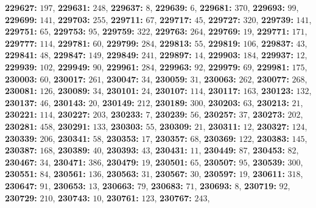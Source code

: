 \textsf{\bfseries 229627:} $197$, \textsf{\bfseries 229631:} $248$, \textsf{\bfseries 229637:} $8$, \textsf{\bfseries 229639:} $6$, \textsf{\bfseries 229681:} $370$, \textsf{\bfseries 229693:} $99$, \textsf{\bfseries 229699:} $141$, \textsf{\bfseries 229703:} $255$, \textsf{\bfseries 229711:} $67$, \textsf{\bfseries 229717:} $45$, \textsf{\bfseries 229727:} $320$, \textsf{\bfseries 229739:} $141$, \textsf{\bfseries 229751:} $65$, \textsf{\bfseries 229753:} $95$, \textsf{\bfseries 229759:} $322$, \textsf{\bfseries 229763:} $264$, \textsf{\bfseries 229769:} $19$, \textsf{\bfseries 229771:} $171$, \textsf{\bfseries 229777:} $114$, \textsf{\bfseries 229781:} $60$, \textsf{\bfseries 229799:} $284$, \textsf{\bfseries 229813:} $55$, \textsf{\bfseries 229819:} $106$, \textsf{\bfseries 229837:} $43$, \textsf{\bfseries 229841:} $48$, \textsf{\bfseries 229847:} $149$, \textsf{\bfseries 229849:} $241$, \textsf{\bfseries 229897:} $14$, \textsf{\bfseries 229903:} $184$, \textsf{\bfseries 229937:} $12$, \textsf{\bfseries 229939:} $102$, \textsf{\bfseries 229949:} $90$, \textsf{\bfseries 229961:} $284$, \textsf{\bfseries 229963:} $92$, \textsf{\bfseries 229979:} $69$, \textsf{\bfseries 229981:} $175$, \textsf{\bfseries 230003:} $60$, \textsf{\bfseries 230017:} $261$, \textsf{\bfseries 230047:} $34$, \textsf{\bfseries 230059:} $31$, \textsf{\bfseries 230063:} $262$, \textsf{\bfseries 230077:} $268$, \textsf{\bfseries 230081:} $126$, \textsf{\bfseries 230089:} $34$, \textsf{\bfseries 230101:} $24$, \textsf{\bfseries 230107:} $114$, \textsf{\bfseries 230117:} $163$, \textsf{\bfseries 230123:} $132$, \textsf{\bfseries 230137:} $46$, \textsf{\bfseries 230143:} $20$, \textsf{\bfseries 230149:} $212$, \textsf{\bfseries 230189:} $300$, \textsf{\bfseries 230203:} $63$, \textsf{\bfseries 230213:} $21$, \textsf{\bfseries 230221:} $114$, \textsf{\bfseries 230227:} $203$, \textsf{\bfseries 230233:} $7$, \textsf{\bfseries 230239:} $56$, \textsf{\bfseries 230257:} $37$, \textsf{\bfseries 230273:} $202$, \textsf{\bfseries 230281:} $458$, \textsf{\bfseries 230291:} $133$, \textsf{\bfseries 230303:} $55$, \textsf{\bfseries 230309:} $21$, \textsf{\bfseries 230311:} $12$, \textsf{\bfseries 230327:} $124$, \textsf{\bfseries 230339:} $206$, \textsf{\bfseries 230341:} $58$, \textsf{\bfseries 230353:} $17$, \textsf{\bfseries 230357:} $68$, \textsf{\bfseries 230369:} $122$, \textsf{\bfseries 230383:} $145$, \textsf{\bfseries 230387:} $168$, \textsf{\bfseries 230389:} $40$, \textsf{\bfseries 230393:} $43$, \textsf{\bfseries 230431:} $11$, \textsf{\bfseries 230449:} $87$, \textsf{\bfseries 230453:} $82$, \textsf{\bfseries 230467:} $34$, \textsf{\bfseries 230471:} $386$, \textsf{\bfseries 230479:} $19$, \textsf{\bfseries 230501:} $65$, \textsf{\bfseries 230507:} $95$, \textsf{\bfseries 230539:} $300$, \textsf{\bfseries 230551:} $84$, \textsf{\bfseries 230561:} $136$, \textsf{\bfseries 230563:} $31$, \textsf{\bfseries 230567:} $30$, \textsf{\bfseries 230597:} $19$, \textsf{\bfseries 230611:} $318$, \textsf{\bfseries 230647:} $91$, \textsf{\bfseries 230653:} $13$, \textsf{\bfseries 230663:} $79$, \textsf{\bfseries 230683:} $71$, \textsf{\bfseries 230693:} $8$, \textsf{\bfseries 230719:} $92$, \textsf{\bfseries 230729:} $210$, \textsf{\bfseries 230743:} $10$, \textsf{\bfseries 230761:} $123$, \textsf{\bfseries 230767:} $243$, 
